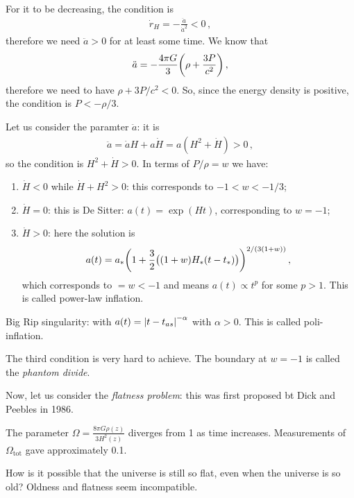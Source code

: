 \documentclass[main.tex]{subfiles}
\begin{document}
For it to be decreasing, the condition is 
%
\begin{align}
  \dot{r}_H = - \frac{ \ddot{a} }{\dot{a}^2} <0
\,,
\end{align}
%
therefore we need \(\ddot{a} >0\) for at least some time.
We know that 
%
\begin{align}
  \ddot{a} = -\frac{4 \pi G }{3} \qty(\rho + \frac{3P}{c^2})
\,,
\end{align}
%
therefore we need to have \(\rho + 3P/c^2 <0\).
So, since the energy density is positive, the condition is \(P < - \rho /3\).

Let us consider the paramter \(\ddot{a}\): it is 
%
\begin{align}
  \ddot{a} = \dot{a}H + a \dot{H} = a (H^2 + \dot{H})>0
\,,
\end{align}
%
so the condition is \(H^2+ \dot{H} >0\). In terms of \(P/ \rho = w\) we have:

\begin{enumerate}
    \item \(\dot{H} < 0\) while \(\dot{H} + H^2 >0\): this corresponds to \(-1 < w < -1/3\);
    \item \(\dot{H} =0\): this is De Sitter: \(a(t) = \exp(Ht) \), corresponding to \(w = -1\);
    \item \(\dot{H} >0\): here the solution is 
    \begin{align}
      a(t) = a_{*} \qty(1 + \frac{3}{2}\qty((1+w)H_{*}\qty(t-t_{*})))^{2/ (3(1+w))}
    \,,
    \end{align}
    which corresponds to \(= w<-1\) and means \(a(t) \propto t^{p}\) for some \(p>1\). This is called power-law inflation.
\end{enumerate}

Big Rip singularity: with \(a(t) = \abs{t - t_{as}}^{- \alpha } \) with \(\alpha >0\). This is called poli-inflation.


The third condition is very hard to achieve.
The boundary at \(w = -1\) is called the \emph{phantom divide}.

Now, let us consider the \emph{flatness problem}:
this was first proposed bt Dick and Peebles in 1986.

The parameter \(\Omega = \frac{8 \pi G \rho(z) }{3 H^2(z)} \) diverges from 1 as time increases.
Measurements of \(\Omega _{\text{tot}}\) gave approximately 0.1.

How is it possible that the universe is still so flat, even when the universe is so old? Oldness and flatness seem incompatible.
\end{document}
